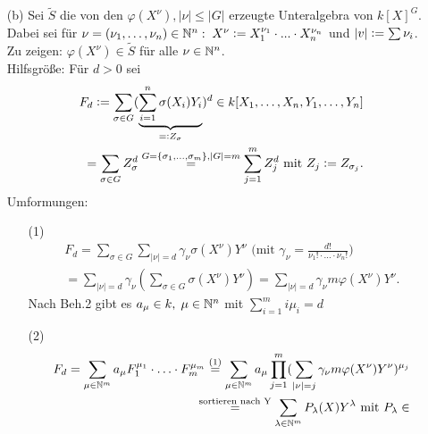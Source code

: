 \documentclass[a4paper, 10pt]{report}
\begin{document}
\begin{Bew}
  \begin{enumerate}
    \item[(b)] Sei $\tilde{S}$ die von den $\varphi(X^{\nu}), |\nu| \le |G|$
    erzeugte Unteralgebra von $k[X]^G$.
    Dabei sei für $\nu = ( \nu_1, \dots, \nu_n) \in \mathbb{N}^n: \; X^{\nu}
    \mathrel{\mathop:}= X_1^{\nu_1} \cdot ... \cdot X_n^{\nu_n}$ und $|v| \mathrel{\mathop:}= \sum
    \nu_i$.\\
    Zu zeigen: $\varphi(X^{\nu}) \in \tilde{S}$ für alle $\nu \in
    \mathbb{N}^n$.\\
    Hilfsgröße: Für $d > 0$ sei
    \begin{equation*}
    \begin{split}
    F_d \mathrel{\mathop:}= \sum_{\sigma \in
    G}(\underset{=\mathrel{\mathop:} Z_{\sigma}}{\underbrace{\sum_{i=1}^n
    \sigma(X_i)Y_i}})^d \in k[X_1, \dots, X_n, Y_1, \dots, Y_n] \\ 
    = \sum_{\sigma \in G} Z_{\sigma}^d \overset{G=\{\sigma_1, \dots, \sigma_m
    \},|G| = m}{=} \sum_{j=1}^m Z_j^d\text{ mit }Z_j \mathrel{\mathop:}= Z_{\sigma_j}.
    \end{split}
    \end{equation*}
    Umformungen:
    \begin{enumerate}
      \item[(1)]
      \begin{equation*}
      \begin{split}
      F_d = \sum_{\sigma \in G} \sum_{|\nu|=d} \gamma_{\nu}
      \sigma(X^{\nu})Y^{\nu}\text{ (mit }\gamma_{\nu} = \frac{d!}{\nu_1! \cdot
      ... \cdot \nu_n! })\\
      = \sum_{|\nu| = d} \gamma_{\nu}(\sum_{\sigma \in G}
      \sigma(X^{\nu})Y^{\nu})
      = \sum_{|\nu| = d} \gamma_{\nu} m \varphi(X^{\nu}) Y^{\nu}.
      \end{split}
      \end{equation*}
      Nach Beh.2 gibt es $a_\mu \in k, \; \mu \in \mathbb{N}^n$ mit $\sum_{i=1}^m
      i \mu_i = d$
      \item[(2)] 
      \begin{equation*}
      \begin{split}
      F_d = \sum_{\mu \in \NN^m} a_{\mu} F_1^{\mu_1} \cdot
      \ldots \cdot F_m^{\mu_m}
      \overset{(1)}{=} \sum_{\mu \in \NN^m}
      a_{\mu} \prod_{j=1}^m (\sum_{|\nu| = j} \gamma_{\nu} m \varphi (X^{\nu}) Y
      ^{\nu})^{\mu_j}\\
      \overset{\text{sortieren nach Y}}{=} \sum_{\lambda \in
      \NN^m} P_{\lambda}(X)Y^{\lambda}\text{ mit }P_{\lambda} \in

\end{split}
\end{equation*}
\end{enumerate}
\end{enumerate}
\end{Bew}
\end{document}

